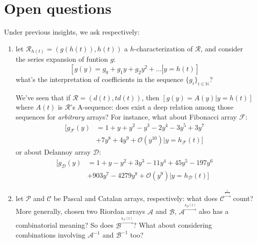 

\section{Open questions}

Under previous insights, we ask respectively:
\begin{enumerate}
    \item let $\mathcal{R}_{h(t)}=\left(g(h(t)), h(t)\right)$ a $h$-characterization 
        of $\mathcal{R}$, and consider the series expansion of funtion $g$:
        \begin{displaymath}
            \left.\left[g(y)=g_0 + g_1 y + g_2 y^2 + \ldots\right|y=h(t)\right] 
        \end{displaymath}
        what's the interpretation of coefficients in the sequence
        $\lbrace g_i\rbrace_{i\in\mathbb{N}}$? 
        
        We've seen that if $\mathcal{R}=\left(d(t), td(t)\right)$, then 
        $[g(y)=A(y)|y=h(t)]$ where $A(t)$ is $\mathcal{R}$'s A-sequence: 
        does exist a deep relation among those sequences for \emph{arbitrary} arrays?   
        For instance, what about Fibonacci array $\mathcal{F}$: 
        \begin{displaymath}
            \begin{split}
                \big[ g_{\mathcal{F}}(y) &= 1 + y + y^{2} - y^{3} -2y^{4} 
                -3 y^{5}  +3 y^{7} \\
                &+7 y^{8} +4 y^{9} + \mathcal{O}\left(y^{10}\right) | y=h_{\mathcal{F}}(t) \big]
            \end{split}
        \end{displaymath}
        or about Delannoy array $\mathcal{D}$: 
        \begin{displaymath}
            \begin{split}
                \big[ g_{\mathcal{D}}(y) &= 1 + y - y^{2} + 3 y^{3} -11y^{4} + 45 y^{5} -197y^{6}\\ 
                &+ 903 y^{7} -4279y^{8} + \mathcal{O}\left(y^{9}\right)| y=h_{\mathcal{D}}(t) \big]
            \end{split}
        \end{displaymath}
    \item let $\mathcal{P}$ and $\mathcal{C}$ be Pascal and Catalan arrays, respectively: 
        what does $\mathcal{C}^{\stackrel{\frac{t}{1-t}}{\rightarrow}}$ count? 
        More generally, chosen two Riordan arrays $\mathcal{A}$ and $\mathcal{B}$, 
        $\mathcal{A}^{\stackrel{h_{\mathcal{B}}(t)}{\rightarrow}}$ also has a combinatorial meaning? 
        So does $\mathcal{B}^{\stackrel{h_{\mathcal{A}}(t)}{\rightarrow}}$? What about considering
        combinations involving  $\mathcal{A}^{-1}$ and $\mathcal{B}^{-1}$ too?



\end{enumerate}
